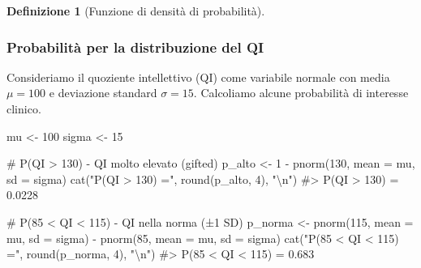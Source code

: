 \documentclass[
  italian,
  letterpaper,
  a4paper,
  11pt,
  open=any]{scrbook}
\newenvironment{Shaded}{\begin{snugshade}}{\end{snugshade}}
\newcommand{\AttributeTok}[1]{\textcolor[rgb]{0.40,0.45,0.13}{#1}}
\newcommand{\CommentTok}[1]{\textcolor[rgb]{0.37,0.37,0.37}{#1}}
\newcommand{\DecValTok}[1]{\textcolor[rgb]{0.68,0.00,0.00}{#1}}
\newcommand{\FunctionTok}[1]{\textcolor[rgb]{0.28,0.35,0.67}{#1}}
\newcommand{\NormalTok}[1]{\textcolor[rgb]{0.00,0.23,0.31}{#1}}
\newcommand{\OtherTok}[1]{\textcolor[rgb]{0.00,0.23,0.31}{#1}}
\newcommand{\SpecialCharTok}[1]{\textcolor[rgb]{0.37,0.37,0.37}{#1}}
\newcommand{\StringTok}[1]{\textcolor[rgb]{0.13,0.47,0.30}{#1}}
\theoremstyle{plain}
\theoremstyle{definition}
\theoremstyle{definition}
\newtheorem{definition}{Definizione}[chapter]
\theoremstyle{remark}
\begin{document}
\begin{definition}[Funzione di densità di
probabilità]
\begin{tcolorbox}[enhanced jigsaw, arc=.35mm, bottomrule=.15mm, bottomtitle=1mm, breakable, colback=white, colbacktitle=quarto-callout-note-color!10!white, colframe=quarto-callout-note-color-frame, coltitle=black, left=2mm, leftrule=.75mm, opacityback=0, opacitybacktitle=0.6, rightrule=.15mm, title=\textcolor{quarto-callout-note-color}{\faInfo}\hspace{0.5em}{Esempio: calcoli con la CDF normale}, titlerule=0mm, toprule=.15mm, toptitle=1mm]

\subsubsection*{Probabilità per la distribuzione del
QI}\label{probabilituxe0-per-la-distribuzione-del-qi}

Consideriamo il quoziente intellettivo (QI) come variabile normale con
media \(\mu = 100\) e deviazione standard \(\sigma = 15\). Calcoliamo
alcune probabilità di interesse clinico.

\begin{Shaded}
\begin{Highlighting}[]
\NormalTok{mu }\OtherTok{\textless{}{-}} \DecValTok{100}
\NormalTok{sigma }\OtherTok{\textless{}{-}} \DecValTok{15}

\CommentTok{\# P(QI \textgreater{} 130) {-} QI molto elevato (gifted)}
\NormalTok{p\_alto }\OtherTok{\textless{}{-}} \DecValTok{1} \SpecialCharTok{{-}} \FunctionTok{pnorm}\NormalTok{(}\DecValTok{130}\NormalTok{, }\AttributeTok{mean =}\NormalTok{ mu, }\AttributeTok{sd =}\NormalTok{ sigma)}
\FunctionTok{cat}\NormalTok{(}\StringTok{"P(QI \textgreater{} 130) ="}\NormalTok{, }\FunctionTok{round}\NormalTok{(p\_alto, }\DecValTok{4}\NormalTok{), }\StringTok{"}\SpecialCharTok{\textbackslash{}n}\StringTok{"}\NormalTok{)}
\CommentTok{\#\textgreater{} P(QI \textgreater{} 130) = 0.0228}

\CommentTok{\# P(85 \textless{} QI \textless{} 115) {-} QI nella norma (±1 SD)}
\NormalTok{p\_norma }\OtherTok{\textless{}{-}} \FunctionTok{pnorm}\NormalTok{(}\DecValTok{115}\NormalTok{, }\AttributeTok{mean =}\NormalTok{ mu, }\AttributeTok{sd =}\NormalTok{ sigma) }\SpecialCharTok{{-}} \FunctionTok{pnorm}\NormalTok{(}\DecValTok{85}\NormalTok{, }\AttributeTok{mean =}\NormalTok{ mu, }\AttributeTok{sd =}\NormalTok{ sigma)}
\FunctionTok{cat}\NormalTok{(}\StringTok{"P(85 \textless{} QI \textless{} 115) ="}\NormalTok{, }\FunctionTok{round}\NormalTok{(p\_norma, }\DecValTok{4}\NormalTok{), }\StringTok{"}\SpecialCharTok{\textbackslash{}n}\StringTok{"}\NormalTok{)}
\CommentTok{\#\textgreater{} P(85 \textless{} QI \textless{} 115) = 0.683}


\end{Highlighting}
\end{Shaded}
\end{tcolorbox}
\end{definition}
\end{document}
